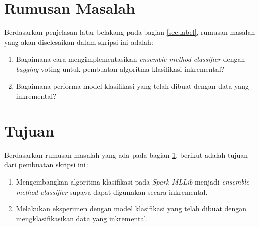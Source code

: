 \documentclass[a4paper,twoside]{article}
\begin{document}
\section{Rumusan Masalah}
\label{sec:rumusan}
Berdasarkan penjelasan latar belakang pada bagian \ref{sec:label}, rumusan masalah yang akan diselesaikan dalam skripsi ini adalah:
\begin{enumerate}
\item Bagaimana cara mengimplementasikan \textit{ensemble method classifier} dengan \textit{bagging} voting untuk pembuatan algoritma klasifikasi inkremental?
\item Bagaimana performa model klasifikasi yang telah dibuat dengan data yang inkremental?
\end{enumerate}

\section{Tujuan}
Berdasarkan rumusan masalah yang ada pada bagian \ref{sec:rumusan}, berikut adalah tujuan dari pembuatan skripsi ini:
\begin{enumerate}
\item Mengembangkan algoritma klasifikasi pada \textit{Spark MLLib} menjadi \textit{ensemble method classifier} supaya dapat digunakan secara inkremental.
\item Melakukan eksperimen dengan model klasifikasi yang telah dibuat dengan mengklasifikasikan data yang inkremental.
\end{enumerate}
\end{document}
